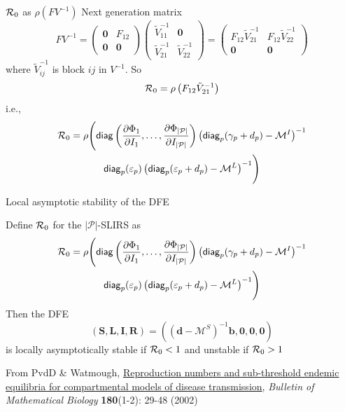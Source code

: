 \documentclass[aspectratio=169]{beamer}\usepackage[]{graphicx}\usepackage[]{xcolor}
\begin{document}
\begin{frame}{$\mathcal{R}_0$ as $\rho(FV^{-1})$}
Next generation matrix
$$
FV^{-1}=
\begin{pmatrix}
\mathbf{0} & F_{12} \\
\mathbf{0} & \mathbf{0}
\end{pmatrix}
\begin{pmatrix}
\tilde V_{11}^{-1} & \mathbf{0} \\
\tilde V_{21}^{-1} & \tilde V_{22}^{-1}
\end{pmatrix}
=
\begin{pmatrix}
F_{12}\tilde V_{21}^{-1} & F_{12}\tilde V_{22}^{-1} \\
\mathbf{0} & \mathbf{0}
\end{pmatrix}
$$
where $\tilde V_{ij}^{-1}$ is block $ij$ in $V^{-1}$. So
$$
\mathcal{R}_0=\rho\left(F_{12}\tilde{V}_{21}^{-1}\right)
$$
i.e.,
\begin{multline*}
	\mathcal{R}_0=\rho\Biggl(
		\mathsf{diag}
		\left(
		\frac{\partial\Phi_1}{\partial I_1},\ldots,
		\frac{\partial\Phi_{|\mathcal{P}|}}{\partial I_{|\mathcal{P}|}}
		\right)
		\left(\mathsf{diag}_p(\gamma_p+d_p)-\mathcal{M}^I\right)^{-1}
		\\ 
		\mathsf{diag}_p(\varepsilon_p)
		\left(\mathsf{diag}_p(\varepsilon_p+d_p)-\mathcal{M}^L\right)^{-1} 
		\Biggr)			
\end{multline*}
\end{frame}

\begin{frame}{Local asymptotic stability of the DFE}
\begin{theorem}\label{th:LAS_DFE_pSLIRS_toy}
	Define $\mathcal{R}_0$ for the $|\mathcal{P}|$-SLIRS as 
  \begin{multline*}
	\mathcal{R}_0=\rho\Biggl(
		\mathsf{diag}
		\left(
		\frac{\partial\Phi_1}{\partial I_1},\ldots,
		\frac{\partial\Phi_{|\mathcal{P}|}}{\partial I_{|\mathcal{P}|}}
		\right)
		\left(\mathsf{diag}_p(\gamma_p+d_p)-\mathcal{M}^I\right)^{-1}
		\\ 
		\mathsf{diag}_p(\varepsilon_p)
		\left(\mathsf{diag}_p(\varepsilon_p+d_p)-\mathcal{M}^L\right)^{-1} 
		\Biggr)			
  \end{multline*}
	Then the DFE
	$$
	(\mathbf{S},\mathbf{L},\mathbf{I},\mathbf{R})=\left((\mathbf{d}-\mathcal{M}^S)^{-1}\mathbf{b},\mathbf{0},\mathbf{0},\mathbf{0}\right)
	$$
	is locally asymptotically stable if $\mathcal{R}_0<1$ and unstable if $\mathcal{R}_0>1$		
\end{theorem}
\vfill
{\tiny
From PvdD \& Watmough, \href{https://doi.org/10.1016/S0025-5564(02)00108-6}{Reproduction numbers and sub-threshold endemic equilibria for compartmental models of disease transmission}, \emph{Bulletin of Mathematical Biology} \textbf{180}(1-2): 29-48 (2002)}
\end{frame}
\end{document}
